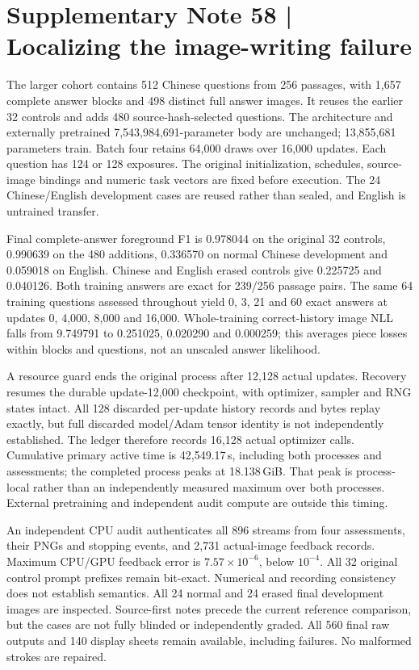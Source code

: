 \clearpage
\section*{Supplementary Note 58 | Localizing the image-writing failure}
\label{note:writing-failure}
The larger cohort contains 512 Chinese questions from 256 passages, with
1,657 complete answer blocks and 498 distinct full answer images. It reuses
the earlier 32 controls and adds 480 source-hash-selected questions. The
architecture and externally pretrained 7,543,984,691-parameter body are
unchanged; 13,855,681 parameters train. Batch four retains 64,000 draws over
16,000 updates. Each question has 124 or 128 exposures. The original
initialization, schedules, source-image bindings and numeric task vectors
are fixed before execution. The 24 Chinese/English development cases are
reused rather than sealed, and English is untrained transfer.

Final complete-answer foreground F1 is 0.978044 on the original 32 controls,
0.990639 on the 480 additions, 0.336570 on normal Chinese development and
0.059018 on English. Chinese and English erased controls give 0.225725 and
0.040126. Both training answers are exact for 239/256 passage pairs. The same
64 training questions assessed throughout yield 0, 3, 21 and 60 exact answers
at updates 0, 4,000, 8,000 and 16,000. Whole-training correct-history image
NLL falls from 9.749791 to 0.251025, 0.020290 and 0.000259; this averages
piece losses within blocks and questions, not an unscaled answer likelihood.

A resource guard ends the original process after 12,128 actual updates.
Recovery resumes the durable update-12,000 checkpoint, with optimizer,
sampler and RNG states intact. All 128 discarded per-update history records
and bytes replay exactly, but full discarded model/Adam tensor identity is
not independently established. The ledger therefore records 16,128 actual
optimizer calls. Cumulative primary active time is 42,549.17\,s, including
both processes and assessments; the completed process peaks at
18.138\,GiB. That peak is process-local rather than an independently measured
maximum over both processes. External pretraining and independent audit
compute are outside this timing.

An independent CPU audit authenticates all 896 streams from four assessments,
their PNGs and stopping events, and 2,731 actual-image feedback records.
Maximum CPU/GPU feedback error is $7.57\times10^{-6}$, below $10^{-4}$.
All 32 original control prompt prefixes remain bit-exact. Numerical and
recording consistency does not establish semantics. All 24 normal and
24 erased final development images are inspected. Source-first notes precede
the current reference comparison, but the cases are not fully blinded or
independently graded. All 560 final raw outputs and 140 display sheets remain
available, including failures. No malformed strokes are repaired.


